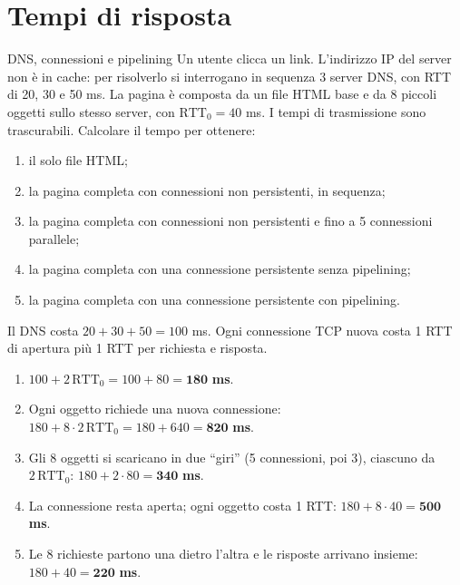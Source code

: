 \section{Tempi di risposta}

\begin{esercizio}{DNS, connessioni e pipelining}
Un utente clicca un link. L'indirizzo IP del server non è in cache: per risolverlo si interrogano in sequenza 3 server DNS, con
RTT di 20, 30 e 50 ms. La pagina è composta da un file HTML base e da 8 piccoli oggetti sullo stesso server, con
$\text{RTT}_0 = 40$ ms. I tempi di trasmissione sono trascurabili. Calcolare il tempo per ottenere:
\begin{enumerate}[label=(\alph*)]
    \item il solo file HTML;
    \item la pagina completa con connessioni non persistenti, in sequenza;
    \item la pagina completa con connessioni non persistenti e fino a 5 connessioni parallele;
    \item la pagina completa con una connessione persistente senza pipelining;
    \item la pagina completa con una connessione persistente con pipelining.
\end{enumerate}
\end{esercizio}

\svolgimento
Il DNS costa $20 + 30 + 50 = 100$ ms. Ogni connessione TCP nuova costa 1 RTT di apertura più 1 RTT per richiesta e risposta.
\begin{enumerate}[label=(\alph*)]
    \item $100 + 2\,\text{RTT}_0 = 100 + 80 = \mathbf{180}$ \textbf{ms}.
    \item Ogni oggetto richiede una nuova connessione: $180 + 8 \cdot 2\,\text{RTT}_0 = 180 + 640 = \mathbf{820}$ \textbf{ms}.
    \item Gli 8 oggetti si scaricano in due ``giri'' (5 connessioni, poi 3), ciascuno da $2\,\text{RTT}_0$:
          $180 + 2 \cdot 80 = \mathbf{340}$ \textbf{ms}.
    \item La connessione resta aperta; ogni oggetto costa 1 RTT: $180 + 8 \cdot 40 = \mathbf{500}$ \textbf{ms}.
    \item Le 8 richieste partono una dietro l'altra e le risposte arrivano insieme: $180 + 40 = \mathbf{220}$ \textbf{ms}.
\end{enumerate}

